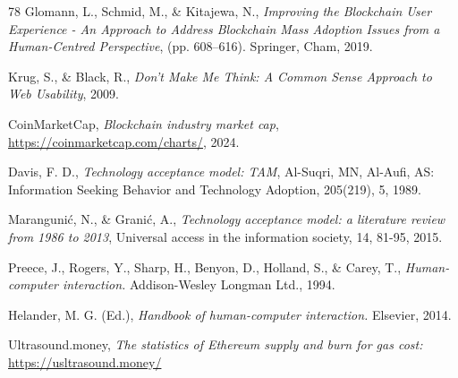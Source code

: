 \documentclass[preprint,12pt]{elsarticle}
\begin{document}
\begin{thebibliography}{78}
Glomann, L., Schmid, M., \& Kitajewa, N.,
\textit{Improving the Blockchain User Experience - An Approach to Address Blockchain Mass Adoption Issues from a Human-Centred Perspective},
(pp. 608–616). Springer, Cham,
2019.

Krug, S., \& Black, R.,
\textit{Don't Make Me Think: A Common Sense Approach to Web Usability},
2009.

CoinMarketCap,
\textit{Blockchain industry market cap},
\url{https://coinmarketcap.com/charts/},
2024.

Davis, F. D.,
\textit{Technology acceptance model: TAM},
Al-Suqri, MN, Al-Aufi, AS: Information Seeking Behavior and Technology Adoption, 205(219), 5,
1989.

Marangunić, N., \& Granić, A.,
\textit{Technology acceptance model: a literature review from 1986 to 2013},
Universal access in the information society, 14, 81-95,
2015.

Preece, J., Rogers, Y., Sharp, H., Benyon, D., Holland, S., \& Carey, T.,
\textit{Human-computer interaction.} Addison-Wesley Longman Ltd., 1994.

Helander, M. G. (Ed.),
\textit{Handbook of human-computer interaction.} Elsevier, 2014.

Ultrasound.money,
\textit{The statistics of Ethereum supply and burn for gas cost:}
\url{https://usltrasound.money/}


\end{thebibliography}
\end{document}
